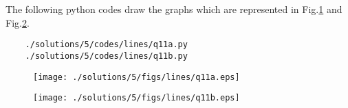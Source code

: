 	The following python codes draw the graphs which are represented in Fig.\ref{fig:3.7.5_qelevena} and Fig.\ref{fig:3.7.5_qelevenb}.
	\begin{lstlisting}
	./solutions/5/codes/lines/q11a.py
	./solutions/5/codes/lines/q11b.py
	\end{lstlisting}
	\solution
	\begin{figure}[!ht]
	\centering
	\texttt{[image: ./solutions/5/figs/lines/q11a.eps]}
	\caption{}
	\label{fig:3.7.5_qelevena}	
	\end{figure}
	\begin{figure}[!ht]
	\centering
	\texttt{[image: ./solutions/5/figs/lines/q11b.eps]}
	\caption{}
	\label{fig:3.7.5_qelevenb}	
	\end{figure}
	
